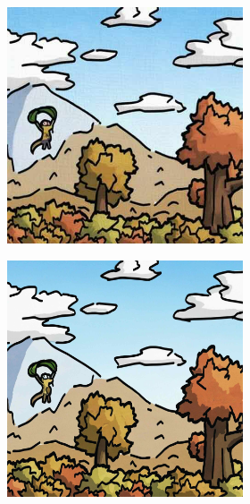 \documentclass{article}
\begin{document}
\begin{figure}[h]
\begin{subfigure}[t]{\textwidth}
\begin{subfigure}[b]{0.24\textwidth}
     \end{subfigure}
     \hfill
     \begin{subfigure}[b]{0.24\textwidth}
         \centering
         \includegraphics[width=\textwidth]{plots/process/preprocess/antidb/diffpure.jpg}
     \end{subfigure}
     \hfill
     \begin{subfigure}[b]{0.24\textwidth}
         \centering
         \includegraphics[width=\textwidth]{plots/process/preprocess/antidb/upscale.jpg}

\end{subfigure}
\end{subfigure}
\end{figure}
\end{document}

